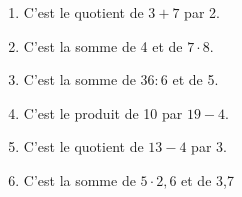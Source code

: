 %
%
    \begin{enumerate}
        \item C'est le quotient de $3 + 7$ par 2.
        \item C'est la somme de 4 et de $7 \cdot 8$.
        \item C'est la somme de $36 : 6$ et de 5.
        \item C'est le produit de 10 par $19 - 4$.
        \item C'est le quotient de $13 - 4$ par 3.
        \item C'est la somme de $5 \cdot 2,6$ et de 3,7
    \end{enumerate}
